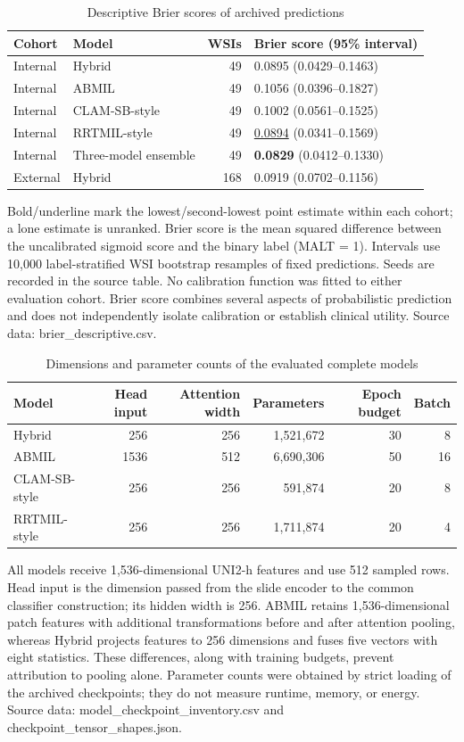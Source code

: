 \clearpage
\begin{table}[H]\centering
\caption{Descriptive Brier scores of archived predictions}\label{tab:S13}
\small
\begin{tabular}{llrl}
\toprule
Cohort & Model & WSIs & Brier score (95\% interval) \\
\midrule
Internal & Hybrid & 49 & 0.0895 (0.0429--0.1463) \\
Internal & ABMIL & 49 & 0.1056 (0.0396--0.1827) \\
Internal & CLAM-SB-style & 49 & 0.1002 (0.0561--0.1525) \\
Internal & RRTMIL-style & 49 & \underline{0.0894} (0.0341--0.1569) \\
Internal & Three-model ensemble & 49 & \textbf{0.0829} (0.0412--0.1330) \\
External & Hybrid & 168 & 0.0919 (0.0702--0.1156) \\
\bottomrule
\end{tabular}
\par\medskip\raggedright\footnotesize Bold/underline mark the lowest/second-lowest point estimate within each cohort; a lone estimate is unranked. Brier score is the mean squared difference between the uncalibrated sigmoid score and the binary label (MALT = 1). Intervals use 10,000 label-stratified WSI bootstrap resamples of fixed predictions. Seeds are recorded in the source table. No calibration function was fitted to either evaluation cohort. Brier score combines several aspects of probabilistic prediction and does not independently isolate calibration or establish clinical utility. Source data: brier\_descriptive.csv.
\end{table}
\clearpage
\begin{table}[H]\centering
\caption{Dimensions and parameter counts of the evaluated complete models}\label{tab:S14}
\small
\begin{tabular}{lrrrrr}
\toprule
Model & Head input & Attention width & Parameters & Epoch budget & Batch \\
\midrule
Hybrid & 256 & 256 & 1,521,672 & 30 & 8 \\
ABMIL & 1536 & 512 & 6,690,306 & 50 & 16 \\
CLAM-SB-style & 256 & 256 & 591,874 & 20 & 8 \\
RRTMIL-style & 256 & 256 & 1,711,874 & 20 & 4 \\
\bottomrule
\end{tabular}
\par\medskip\raggedright\footnotesize All models receive 1,536-dimensional UNI2-h features and use 512 sampled rows. Head input is the dimension passed from the slide encoder to the common classifier construction; its hidden width is 256. ABMIL retains 1,536-dimensional patch features with additional transformations before and after attention pooling, whereas Hybrid projects features to 256 dimensions and fuses five vectors with eight statistics. These differences, along with training budgets, prevent attribution to pooling alone. Parameter counts were obtained by strict loading of the archived checkpoints; they do not measure runtime, memory, or energy. Source data: model\_checkpoint\_inventory.csv and checkpoint\_tensor\_shapes.json.
\end{table}
